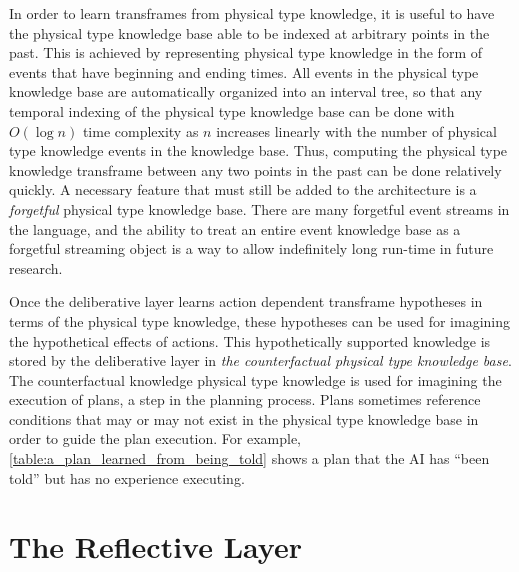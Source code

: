 In order to learn transframes from physical type knowledge, it is
useful to have the physical type knowledge base able to be indexed at
arbitrary points in the past.  This is achieved by representing
physical type knowledge in the form of events that have beginning and
ending times.  All events in the physical type knowledge base are
automatically organized into an interval tree, so that any temporal
indexing of the physical type knowledge base can be done with $O(\log
n)$ time complexity as $n$ increases linearly with the number of
physical type knowledge events in the knowledge base.  Thus, computing
the physical type knowledge transframe between any two points in the
past can be done relatively quickly.  A necessary feature that must
still be added to the architecture is a \emph{forgetful} physical type
knowledge base.  There are many forgetful event streams in the
language, and the ability to treat an entire event knowledge base as a
forgetful streaming object is a way to allow indefinitely long
run-time in future research.

Once the deliberative layer learns action dependent transframe
hypotheses in terms of the physical type knowledge, these hypotheses
can be used for imagining the hypothetical effects of actions.  This
hypothetically supported knowledge is stored by the deliberative layer
in \emph{the counterfactual physical type knowledge base}.  The
counterfactual knowledge physical type knowledge is used for imagining
the execution of plans, a step in the planning process.  Plans
sometimes reference conditions that may or may not exist in the
physical type knowledge base in order to guide the plan execution.
For example, {\mbox{\autoref{table:a_plan_learned_from_being_told}}}
shows a plan that the AI has ``been told'' but has no experience
executing.

\section{The Reflective Layer}


